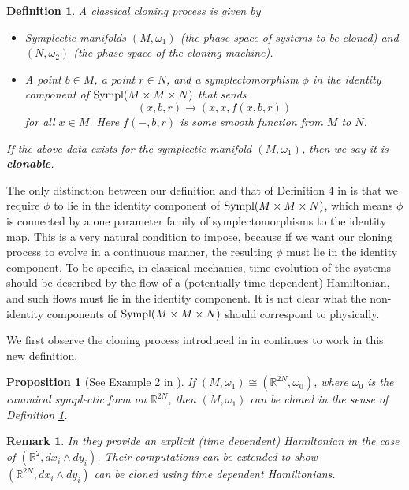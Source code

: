 \documentclass[jmp,amsmath,amssymb]{revtex4-1}
\theoremstyle{plain}
\newtheorem{proposition}[theorem]{Proposition}
\newtheorem{remark}[theorem]{Remark}
\newtheorem{definition}[theorem]{Definition}
\begin{document}
\begin{definition} \label{def:clone}
A classical cloning process is given by
\begin{itemize}
    \item Symplectic manifolds $(M, \omega_1)$ (the phase space of systems to be cloned) and $(N, \omega_2)$ (the phase space of the cloning machine). 
    \item A point $b \in M$, a point $r \in N$, and a symplectomorphism $\phi$ in the identity component of $\textup{Sympl}(M\times M \times N)$ that sends
    \[
    (x,b,r) \rightarrow (x,x,f(x,b,r))
    \]
    for all $x \in M$. Here $f(-,b,r)$ is some smooth function from $M$ to $N$.
\end{itemize}
If the above data exists for the symplectic manifold $(M,\omega_1)$, then we say it is \textbf{clonable}.
\end{definition}
The only distinction between our definition and that of Definition 4 in \cite{fenyes} is that we require $\phi$ to lie in the identity component of $\textup{Sympl}(M\times M \times N)$, which means $\phi$ is connected by a one parameter family of symplectomorphisms to the identity map. This is a very natural condition to impose, because if we want our cloning process to evolve in a continuous manner, the resulting $\phi$ must lie in the identity component. To be specific, in classical mechanics, time evolution of the systems should be described by the flow of a (potentially time dependent) Hamiltonian, and such flows must lie in the identity component. It is not clear what the non-identity components of $\textup{Sympl}(M\times M \times N)$ should correspond to physically.

We first observe the cloning process introduced in in \cite[Example 1,2]{fenyes} continues to work in this new definition.
\begin{proposition}[See Example 2 in \cite{fenyes}] \label{prop:R2n}
    If $(M, \omega_1) \cong (\mathbb{R}^{2N},\omega_0)$, where $\omega_0$ is the canonical symplectic form on $\mathbb{R}^{2N}$, then $(M,\omega_1)$ can be cloned in the sense of Definition \ref{def:clone}.
\end{proposition}


\begin{remark}
In \cite{REDDY2019125846} they provide an explicit (time dependent) Hamiltonian in the case of $(\mathbb{R}^2,dx_i \wedge dy_i)$. Their computations can be extended to show $(\mathbb{R}^{2N},dx_i\wedge dy_i)$ can be cloned using time dependent Hamiltonians.
\end{remark}
\end{document}
